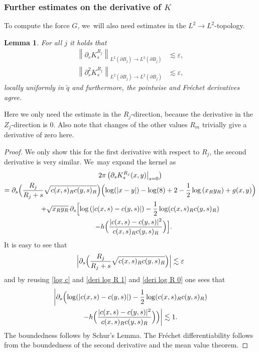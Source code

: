 \documentclass[JEP,XML,SOM,Unicode,published]{cedram}
\let\epsilon\varepsilon
\newtheorem{lemma}[theorem]{Lemma}
\theoremstyle{definition}
\newcommand\norm[1]{\left\lVert #1\right\rVert}
\newcommand\eq{=}
\let\de\partial
\let\eps\epsilon
\begin{document}
\subsubsection{Further estimates on the derivative of $K$}
To compute the force $G$, we~will also need estimates in the $L^2\to L^2$-topology.

\begin{lemma}\label{deri K L2}
For all $j$ it holds that
\begin{align*}
\norm{\de_s K_s^{R_j}}_{L^2(\de B_j)\to L^2(\de B_j)}&\lesssim \eps,
\\
\tag*{and}
\norm{\de_s^2 K_s^{R_j}}_{L^2(\de B_j)\to L^2(\de B_j)}&\lesssim \eps,
\end{align*}
locally uniformly in $\tilde{q}$ and furthermore, the pointwise and Fréchet derivatives agree.
\end{lemma}

Here we only need the estimate in the $R_j$-direction, because the derivative in the $Z_j$-direction is $0$. Also note that changes of the other values $R_m$ trivially give a derivative of zero here.

\pagebreak[2]
\begin{proof}
We only show this for the first derivative with respect to $R_j$, the second derivative is very similar. We~may expand the kernel as
\begin{multline*}
2\pi\left(\de_sK_s^{R_j}(x,y)\big|_{s=0}\right)\\
\eq \de_s\Bigl(\frac{R_j}{R_j+s}\sqrt{c(x,s)_Rc(y,s)_R}\Bigr)\Bigl(\log(|x-y|)-\log(8)+2-\frac{1}{2}\log\left(x_Ry_R\right)+g(x,y)\Bigr)\\
+\sqrt{x_Ry_R}\,\de_s\Bigl[\log\left(|c(x,s)-c(y,s)|\right)-\frac{1}{2}\log(c(x,s)_Rc(y,s)_R)\\
\quad-h\Bigl(\frac{|c(x,s)-c(y,s)|^2}{c(x,s)_Rc(y,s)_R}\Bigr)\Bigr].
\end{multline*}
It is easy to see that
\begin{align*}
\Bigl|\de_s\Bigl(\frac{R_j}{R_j+s}\sqrt{c(x,s)_Rc(y,s)_R}\Bigr)\Bigr|\lesssim \eps
\end{align*}
and by reusing \eqref{log c} and \eqref{deri log R 1} and \eqref{deri log R 0} one sees that
\begin{multline}\label{bd sqrt}
\biggl|\de_s\Bigl(\log(|c(x,s)-c(y,s)|)-\frac{1}{2}\log(c(x,s)_Rc(y,s)_R)\\
-h\Bigl(\frac{|c(x,s)-c(y,s)|^2}{c(x,s)_Rc(y,s)_R}\Bigr)\Bigr)\biggr|\lesssim 1.
\end{multline}
The boundedness follows by Schur's Lemma. The Fréchet differentiability follows from the boundedness of the second derivative and the mean value theorem.
\end{proof}
\end{document}
